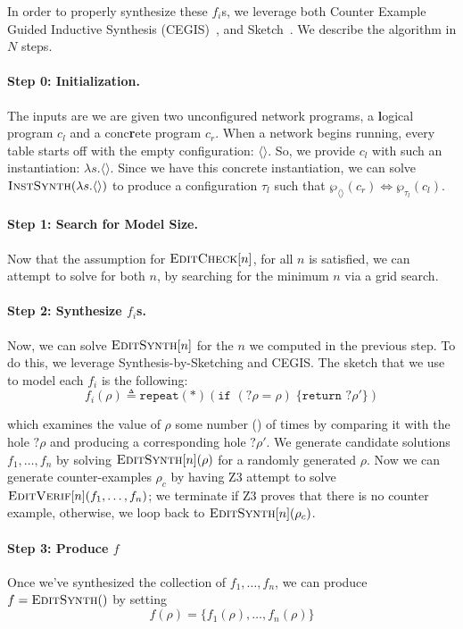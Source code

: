 In order to properly synthesize these $f_i$s, we leverage both Counter Example
Guided Inductive Synthesis (CEGIS)~\cite{CEGIS}, and Sketch~\cite{Sketch}. We
describe the algorithm in $N$ steps.

\paragraph{Step 0: Initialization.} The inputs are we are given two unconfigured
network programs, a \textbf{l}ogical program $c_l$ and a conc\textbf{r}ete
program $c_r$. When a network begins running, every table starts off with the
empty configuration: $\langle\rangle$. So, we provide $c_l$ with such an
instantiation: $\lambda s. \langle \rangle$. Since we have this concrete
instantiation, we can solve $\textsc{InstSynth}(\lambda s. \langle\rangle)$ to
produce a configuration $\tau_l$ such that
$\wp_{\langle\rangle}(c_r) \Leftrightarrow \wp_{\tau_l}(c_l)$.

\paragraph{Step 1: Search for Model Size.} Now that the assumption for
$\textsc{EditCheck}[n]$, for all $n$ is satisfied, we can attempt to solve for
both $n$, by searching for the minimum $n$ via a grid search.

\paragraph{Step 2: Synthesize $f_i$s.} Now, we can solve $\textsc{EditSynth}[n]$
for the $n$ we computed in the previous step. To do this, we leverage
Synthesis-by-Sketching and CEGIS. The sketch that we use to model each $f_i$ is
the following:
\[f_i(\rho) \triangleq \texttt{repeat}(*)\left(\texttt{if }(?\rho = \rho)\;\{\texttt{return }?\rho'\}\right)\]

which examines the value of $\rho$ some number () of times by comparing it with
the hole $?\rho$ and producing a corresponding hole $?\rho'$. We generate
candidate solutions $f_1,\ldots, f_n$ by solving $\textsc{EditSynth}[n](\rho)$
for a randomly generated $\rho$. Now we can generate counter-examples $\rho_c$
by having Z3 attempt to solve $\textsc{EditVerif}[n](f_1,\ldots,f_n)$; we
terminate if Z3 proves that there is no counter example, otherwise, we loop back
to $\textsc{EditSynth}[n](\rho_c)$. 

\paragraph{Step 3: Produce $f$} Once we've synthesized the collection of
$f_1, \ldots, f_n$, we can produce $f = \textsc{EditSynth}()$ by setting
\[f(\rho) = \{f_1(\rho), \ldots, f_n(\rho)\}\]


